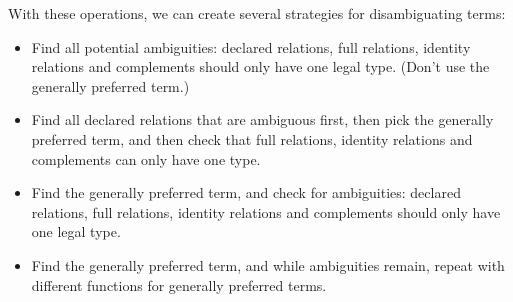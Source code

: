 \documentclass[12pt]{article}
\begin{document}
With these operations, we can create several strategies for disambiguating terms:
\begin{itemize}
\item Find all potential ambiguities: declared relations, full relations, identity relations and complements should only have one legal type. (Don't use the generally preferred term.)
\item Find all declared relations that are ambiguous first, then pick the generally preferred term, and then check that full relations, identity relations and complements can only have one type.
\item Find the generally preferred term, and check for ambiguities: declared relations, full relations, identity relations and complements should only have one legal type.
\item Find the generally preferred term, and while ambiguities remain, repeat with different functions for generally preferred terms.
\end{itemize}
\end{document}
